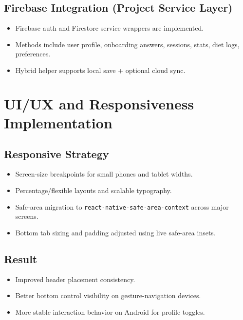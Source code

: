 \documentclass[12pt,a4paper]{article}
\begin{document}
\subsection{Firebase Integration (Project Service Layer)}
\begin{itemize}[leftmargin=1.2cm]
  \item Firebase auth and Firestore service wrappers are implemented.
  \item Methods include user profile, onboarding answers, sessions, stats, diet logs, preferences.
  \item Hybrid helper supports local save + optional cloud sync.
\end{itemize}

\section{UI/UX and Responsiveness Implementation}
\subsection{Responsive Strategy}
\begin{itemize}[leftmargin=1.2cm]
  \item Screen-size breakpoints for small phones and tablet widths.
  \item Percentage/flexible layouts and scalable typography.
  \item Safe-area migration to \texttt{react-native-safe-area-context} across major screens.
  \item Bottom tab sizing and padding adjusted using live safe-area insets.
\end{itemize}

\subsection{Result}
\begin{itemize}[leftmargin=1.2cm]
  \item Improved header placement consistency.
  \item Better bottom control visibility on gesture-navigation devices.
  \item More stable interaction behavior on Android for profile toggles.
\end{itemize}
\end{document}
